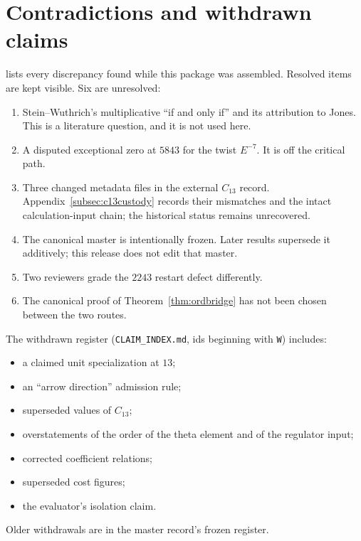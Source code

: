 \section{Contradictions and withdrawn claims}\label{app:register}

 lists every discrepancy found while this package was assembled. Resolved items are kept visible. Six are unresolved:
\begin{enumerate}[leftmargin=*]
\item Stein--Wuthrich's multiplicative ``if and only if'' and its attribution to Jones. This is a literature question, and it is not used here.
\item A disputed exceptional zero at $5843$ for the twist $E^{-7}$. It is off the critical path.
\item Three changed metadata files in the external $C_{13}$ record. Appendix~\ref{subsec:c13custody} records their mismatches and the intact calculation-input chain; the historical status remains unrecovered.
\item The canonical master is intentionally frozen. Later results supersede it additively; this release does not edit that master.
\item Two reviewers grade the $2243$ restart defect differently.
\item The canonical proof of Theorem~\ref{thm:ordbridge} has not been chosen between the two routes.
\end{enumerate}

The withdrawn register (\texttt{CLAIM\_INDEX.md}, ids beginning with \texttt{W}) includes:
\begin{itemize}[leftmargin=*]
\item a claimed unit specialization at $13$;
\item an ``arrow direction'' admission rule;
\item superseded values of $C_{13}$;
\item overstatements of the order of the theta element and of the regulator input;
\item corrected coefficient relations;
\item superseded cost figures;
\item the evaluator's isolation claim.
\end{itemize}
Older withdrawals are in the master record's frozen register.

